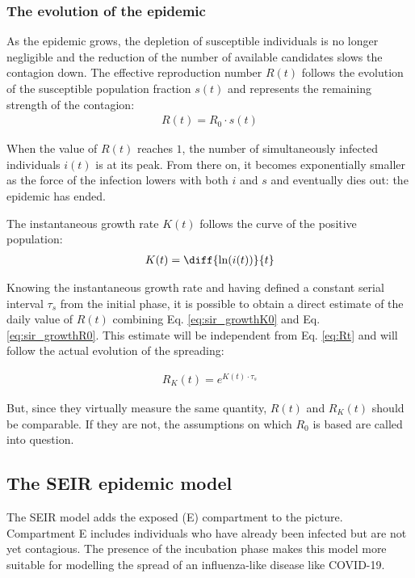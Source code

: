 \documentclass[DIV=12, BCOR=0pt]{scrartcl}  %
\begin{document}
  \subsubsection{The evolution of the epidemic}
  As the epidemic grows, the depletion of susceptible individuals is no longer negligible and the reduction of the number of available candidates slows the contagion down.
  The effective reproduction number $R(t)$ follows the evolution of the susceptible population fraction $s(t)$ and represents the remaining strength of the contagion:
  \begin{align}
		R(t) = R_0 \cdot s(t) 
		\label{eq:Rt}
  \end{align}

  When the value of $R(t)$ reaches $1$, the number of simultaneously infected individuals $i(t)$ is at its peak. From there on, it becomes exponentially smaller as the force of the infection lowers with both $i$ and $s$ and eventually dies out: the epidemic has ended.
  
  The instantaneous growth rate $K(t)$ follows the curve of the positive population:
  \begin{align}
  	K(t) =  \diff{\ln(i(t))}{t}
  	\label{eq:Kt}
  \end{align}

	Knowing the instantaneous growth rate and having defined a constant serial interval $\tau_s$ from the initial phase, it is possible to obtain a direct estimate of the daily value of $R(t)$ combining Eq. \ref{eq:sir_growthK0} and Eq. \ref{eq:sir_growthR0}. This estimate will be independent from Eq. \ref{eq:Rt} and will follow the actual evolution of the spreading:

  \begin{align}
  	R_K(t) = e^{K(t) \cdot \tau_s}
  	\label{eq:RKt}
  \end{align}

	But, since they virtually measure the same quantity, $R(t)$ and $R_K(t)$ should be comparable. If they are not, the assumptions on which $R_0$ is based are called into question.
  
  \subsection{The SEIR epidemic model}
  The SEIR model adds the exposed (E) compartment to the picture. Compartment E includes individuals who have already been infected but are not yet contagious. The presence of the incubation phase makes this model more suitable for modelling the spread of an influenza-like disease like COVID-19. 
  
\end{document}
